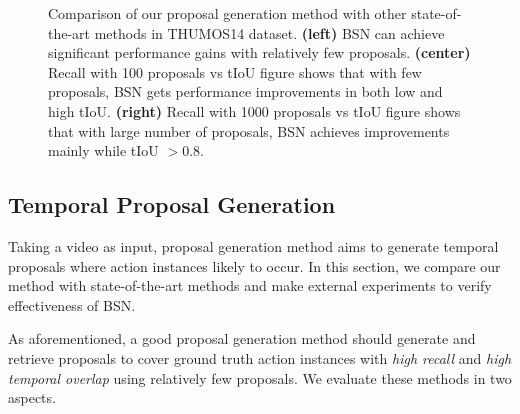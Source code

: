 \documentclass[runningheads]{llncs}
\begin{document}
\begin{figure*}[t]
\setlength{\abovecaptionskip}{-0.2cm} %
\setlength{\belowcaptionskip}{-0.7cm} %
\begin{center}
\begin{minipage}[b]{0.317\linewidth}
\end{minipage}
\hspace{-0.01 in}  
\begin{minipage}[b]{0.33\linewidth}
\end{minipage}
\hspace{-0.05 in}  
\begin{minipage}[b]{0.33\linewidth}
\end{minipage}
\end{center}
   \caption{Comparison of our proposal generation method with other state-of-the-art methods in THUMOS14 dataset. {\bf (left)} BSN can achieve significant performance gains with relatively few proposals. {\bf (center)} Recall with 100 proposals vs tIoU figure shows that with few proposals, BSN gets performance improvements in both low and high tIoU. {\bf (right)} Recall with 1000 proposals vs tIoU figure shows that with large number of proposals, BSN achieves improvements mainly while tIoU $> 0.8$. }
\label{fig_recall}
\end{figure*}


\vspace{-0.15cm}

\subsection{Temporal Proposal Generation}

Taking a video as input, proposal generation method aims to generate temporal proposals where action instances likely to occur. In this section, we compare our method with state-of-the-art methods and  make external experiments to verify effectiveness of BSN.

As aforementioned, a good proposal generation method should generate and retrieve proposals to cover ground truth action instances with \emph{high recall} and \emph{high temporal overlap}  using relatively few proposals. We evaluate these methods in two aspects.
 
\end{document}
